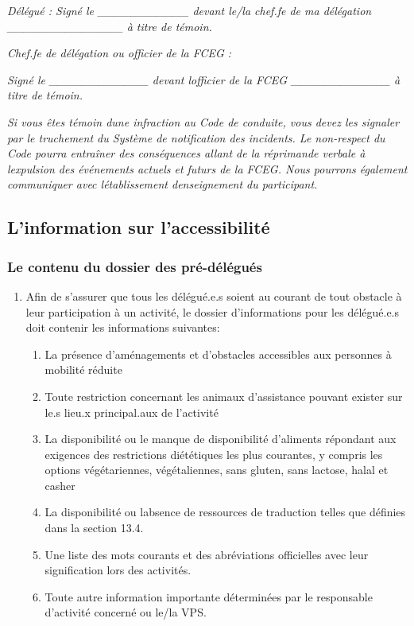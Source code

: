 \emph{Délégué : Signé le \_\_\_\_\_\_\_\_\_\_\_ devant le/la chef.fe de ma délégation \_\_\_\_\_\_\_\_\_\_\_\_\_\_ à titre de témoin.}

\emph{Chef.fe de délégation ou officier de la FCEG :}

\emph{Signé le \_\_\_\_\_\_\_\_\_\_\_\_ devant l\textquotesingle officier de la FCEG \_\_\_\_\_\_\_\_\_\_\_\_ à titre de témoin.}

\emph{Si vous êtes témoin d\textquotesingle une infraction au Code de conduite, vous devez les signaler par le truchement du Système de notification des incidents. Le non-respect du Code pourra entraîner des conséquences allant de la réprimande verbale à l\textquotesingle expulsion des événements actuels et futurs de la FCEG. Nous pourrons également communiquer avec l\textquotesingle établissement d\textquotesingle enseignement du participant.}

\subsection{L'information sur l'accessibilité}
\label{l-information-sur-l-accessibilite}

\subsubsection{Le contenu du dossier des pré-délégués}
\label{le-contenu-du-dossier-des-pre-delegues}

\begin{enumerate}
 \item
  Afin de s'assurer que tous les délégué.e.s soient au courant de tout obstacle à leur participation à un activité, le dossier d'informations pour les délégué.e.s doit contenir les informations suivantes:

  \begin{enumerate}
   \item
    La présence d'aménagements et d'obstacles accessibles aux personnes à mobilité réduite
   \item
    Toute restriction concernant les animaux d'assistance pouvant exister sur le.s lieu.x principal.aux de l'activité
   \item
    La disponibilité ou le manque de disponibilité d'aliments répondant aux exigences des restrictions diététiques les plus courantes, y compris les options végétariennes, végétaliennes, sans gluten, sans lactose, halal et casher
   \item
    La disponibilité ou l\textquotesingle absence de ressources de traduction telles que définies dans la section 13.4.
   \item
    Une liste des mots courants et des abréviations officielles avec leur signification lors des activités.
   \item
    Toute autre information importante déterminées par le responsable d'activité concerné ou le/la VPS.
  \end{enumerate}
\end{enumerate}

